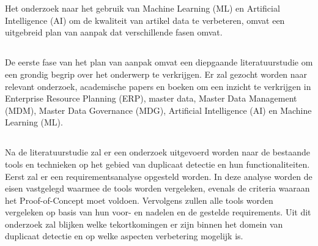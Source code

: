 
\chapter{}%
\label{ch:methodologie}

Het onderzoek naar het gebruik van Machine Learning (ML) en Artificial Intelligence (AI) om de kwaliteit van artikel data te verbeteren, omvat een uitgebreid plan van aanpak dat verschillende fasen omvat.

\section{}%
\label{sec:LiteratuurstudieM}
De eerste fase van het plan van aanpak omvat een diepgaande literatuurstudie om een grondig begrip over het onderwerp te verkrijgen. Er zal gezocht worden naar relevant onderzoek, academische papers en boeken om een inzicht te verkrijgen in Enterprise Resource Planning (ERP), master data, Master Data Management (MDM), Master Data Governance (MDG), Artificial Intelligence (AI) en Machine Learning (ML).

\section{}%
\label{sec:OnderzoekM}
Na de literatuurstudie zal er een onderzoek uitgevoerd worden naar de bestaande tools en technieken op het gebied van duplicaat detectie en hun functionaliteiten. Eerst zal er een requirementsanalyse opgesteld worden. In deze analyse worden de eisen vastgelegd waarmee de tools worden vergeleken, evenals de criteria waaraan het Proof-of-Concept moet voldoen. Vervolgens zullen alle tools worden vergeleken op basis van hun voor- en nadelen en de gestelde requirements. Uit dit onderzoek zal blijken welke tekortkomingen er zijn binnen het domein van duplicaat detectie en op welke aspecten verbetering mogelijk is.

